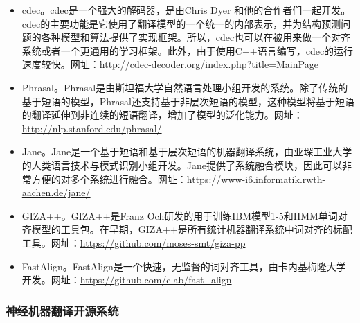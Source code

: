 \begin{itemize}
\vspace{0.5em}
\item cdec。cdec\cite{dyer2010cdec}是一个强大的解码器，是由Chris Dyer 和他的合作者们一起开发。cdec的主要功能是它使用了翻译模型的一个统一的内部表示，并为结构预测问题的各种模型和算法提供了实现框架。所以，cdec也可以在被用来做一个对齐系统或者一个更通用的学习框架。此外，由于使用C++语言编写，cdec的运行速度较快。网址：\url{http://cdec-decoder.org/index.php?title=MainPage}
\vspace{0.5em}
\item Phrasal。Phrasal\cite{Cer2010Phrasal}是由斯坦福大学自然语言处理小组开发的系统。除了传统的基于短语的模型，Phrasal还支持基于非层次短语的模型，这种模型将基于短语的翻译延伸到非连续的短语翻译，增加了模型的泛化能力。网址：\url{http://nlp.stanford.edu/phrasal/}
\vspace{0.5em}
\item Jane。Jane\cite{vilar2012jane}是一个基于短语和基于层次短语的机器翻译系统，由亚琛工业大学的人类语言技术与模式识别小组开发。Jane提供了系统融合模块，因此可以非常方便的对多个系统进行融合。网址：\url{https://www-i6.informatik.rwth-aachen.de/jane/}
\vspace{0.5em}
\item GIZA++。GIZA++\cite{och2003systematic}是Franz Och研发的用于训练IBM模型1-5和HMM单词对齐模型的工具包。在早期，GIZA++是所有统计机器翻译系统中词对齐的标配工具。网址：\url{https://github.com/moses-smt/giza-pp}
\vspace{0.5em}
\item FastAlign。FastAlign\cite{dyer2013a}是一个快速，无监督的词对齐工具，由卡内基梅隆大学开发。网址：\url{https://github.com/clab/fast\_align}
\vspace{0.5em}
\end{itemize}


\subsubsection{神经机器翻译开源系统}

